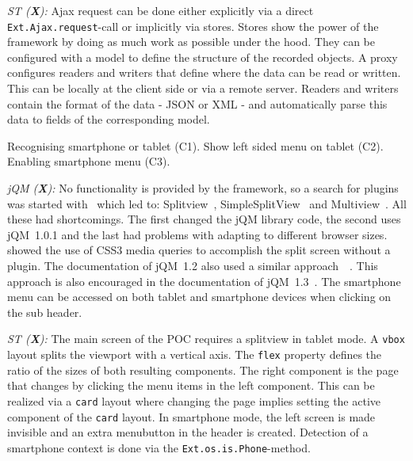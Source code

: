 \documentclass[a4paper]{artikel3}
\newcommand{\code}[1]{\texttt{#1}}
\renewcommand{\paragraph}[1]{\vspace{2mm} \noindent {\bf #1}  }
\newcommand{\framework}[2]{ \emph{#1 (\textbf{#2}): }} %
\newcommand{\challenge}[1]{\paragraph{#1}}
\begin{document}
\framework{ST}{X}
Ajax request can be done either explicitly via a direct \code{Ext.Ajax.request}-call or implicitly via stores.  Stores show the power of the framework by doing as much work as possible under the hood.  They can be configured with a model to define the structure of the recorded objects.  A proxy configures readers and writers that define where the data can be read or written.  This can be locally at the client side or via a remote server.  Readers and writers contain the format of the data - JSON or XML - and automatically parse this data to fields of the corresponding model. 

\challenge{Device-specific layout (C1,C2,C3)}
Recognising smartphone or tablet (C1).
Show left sided menu on tablet (C2).
Enabling smartphone menu (C3).

\framework{jQM}{X}
No functionality is provided by the framework, so a search for plugins was started with~\cite{Deering2012} which led to: Splitview~\cite{Rahman2013}, SimpleSplitView~\cite{Yared2013} and Multiview~\cite{Franck2012}. 
All these had shortcomings. The first changed the jQM library code, the second uses jQM~1.0.1 and the last had problems with adapting to different browser sizes.
\cite{Hadlock2012} showed the use of CSS3 media queries to accomplish the split screen without a plugin.
The documentation of jQM~1.2 also used a similar approach~~\cite{JQuery2012b}.
This approach is also encouraged in the documentation of jQM~1.3~\cite{JQuery2013e}.
The smartphone menu can be accessed on both tablet and smartphone devices when clicking on the sub header.

\framework{ST}{X}
The main screen of the POC requires a splitview in tablet mode.  A \code{vbox} layout splits the viewport with a vertical axis.  The \code{flex} property defines the ratio of the sizes of both resulting components.  The right component is the page that changes by clicking the menu items in the left component.  This can be realized via a \code{card} layout where changing the page implies setting the active component of the \code{card} layout.
In smartphone mode,  the left screen is made invisible and an extra menubutton in the header is created.  Detection of a smartphone context is done via the \code{Ext.os.is.Phone}-method.    


\end{document}
